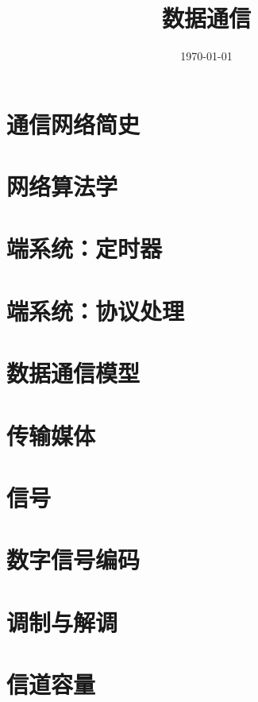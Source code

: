 \documentclass[12pt,a4paper]{book}
\title{\Huge\textbf{数据通信}}
\author{}
\date{\today}
\begin{document}
\frontmatter
\maketitle
\tableofcontents

\mainmatter

\chapter{通信网络简史}


\chapter{网络算法学}


\chapter{端系统：定时器}


\chapter{端系统：协议处理}


\chapter{数据通信模型}


\chapter{传输媒体}


\chapter{信号}


\chapter{数字信号编码}


\chapter{调制与解调}


\chapter{信道容量}

\end{document}
